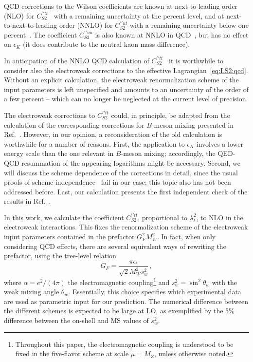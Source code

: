 \documentclass[letter,11pt,DIV=12,abstract=true,numbers=noenddot,titlepage=false,twocolumn=false,draft=false]{scrartcl}
\newcommand{\MS}{$\overline{\text{MS}}$}
\begin{document}
QCD corrections to the Wilson coefficients are known at
next-to-leading order (NLO) for $C_{S2}^{\prime \prime
  tt}$~\cite{Buras:1990fn} with a remaining uncertainty at the percent
level, and at next-to-next-to-leading order (NNLO) for $C_{S2}^{\prime
  \prime ut}$ with a remaining uncertainty below one
percent~\cite{Herrlich:1993yv, Brod:2010mj, Brod:2019rzc}. The
coefficient $C_{S2}^{\prime \prime uu}$ is also known at NNLO in
QCD~\cite{Brod:2011ty, Brod:2019rzc}, but has no effect on
$\epsilon_K$ (it does contribute to the neutral kaon mass difference).

In anticipation of the NNLO QCD calculation of $C_{S2}^{\prime \prime
  tt}$~\cite{BGSY} it is worthwhile to consider also the electroweak
corrections to the effective Lagrangian~\eqref{eq:LS2:qcd}. Without an
explicit calculation, the electroweak renormalization scheme of the
input parameters is left unspecified and amounts to an uncertainty of
the order of a few percent -- which can no longer be neglected at the
current level of precision.

The electroweak corrections to $C_{S2}^{\prime \prime tt}$ could, in
principle, be adapted from the calculation of the corresponding
corrections for $B$-meson mixing presented in
Ref.~\cite{Gambino:1998rt}. However, in our opinion, a reconsideration
of the old calculation is worthwhile for a number of reasons. First,
the application to $\epsilon_K$ involves a lower energy scale than the
one relevant in $B$-meson mixing; accordingly, the QED-QCD resummation
of the appearing logarithms might be necessary. Second, we will
discuss the scheme dependence of the corrections in detail, since the
usual proofs of scheme independence~\cite{Buchalla:1995vs} fail in our
case; this topic also has not been addressed before. Last, our
calculation presents the first independent check of the results in
Ref.~\cite{Gambino:1998rt}.


In this work, we calculate the coefficient $C_{S2}^{\prime \prime
  tt}$, proportional to $\lambda_t^2$, to NLO in the electroweak
interactions. This fixes the renormalization scheme of the electroweak
input parameters contained in the prefactor $G_F^2 M_W^2$. In fact,
when only considering QCD effects, there are several equivalent ways
of rewriting the prefactor, using the tree-level relation
\begin{equation}\label{eq:GF:tree}
G_F
= \frac{\pi \alpha}{\sqrt{2} M_W^2 s_w^2} \,,
\end{equation}
where $\alpha = e^2/(4\pi)$ the electromagnetic
coupling\footnote{Throughout this paper, the electromagnetic coupling
  is understood to be fixed in the five-flavor scheme at scale $\mu =
  M_Z$, unless otherwise noted.}  and $s_w^2 = \sin^2\theta_w$ with
the weak mixing angle $\theta_w$. Essentially, this choice specifies
which experimental data are used as parametric input for our
prediction. The numerical difference between the different schemes is
expected to be large at LO, as exemplified by the 5\% difference
between the on-shell and \MS{} values of $s_w^2$.
\end{document}
